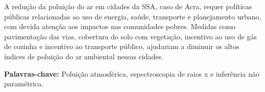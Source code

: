 
A redução da poluição do ar em cidades da SSA, caso de Acra, 
requer políticas públicas relacionadas ao uso de energia, saúde, 
transporte e planejamento urbano, com devida atenção 
aos impactos nas comunidades pobres. 
Medidas como pavimentação das vias, cobertura do solo com vegetação, 
incentivo ao uso de gás de cozinha e incentivo ao transporte público, 
ajudariam a diminuir os altos índices de poluição do ar ambiental nessas cidades.

\par
\vspace{1em}
\noindent\textbf{Palavras-chave:} 
Poluição atmosférica, espectroscopia de raios x e inferência não paramétrica.
